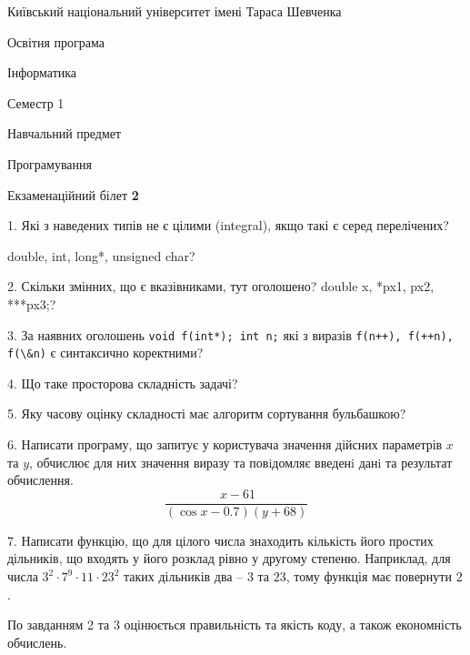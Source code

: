 \documentclass[12pt, ukrainian]{article}
\def\code#1{\Verb!#1!}
\begin{document}
\vspace{0.9cm}
{{\begin {scriptsize}\par
{ \center  Київський національний університет імені Тараса Шевченка \par}
{\parbox {5 cm}{Освітня програма \hfill}{\parbox {7 cm}{Інформатика\hfill}}\parbox {6 cm}{\hfill Семестр 1}}\par
{\parbox {5 cm} {Навчальний предмет \hfill}\parbox {7 cm}{Програмування \hfill}\parbox {6cm}{\hfill}\par}\vspace{-15pt} \end{scriptsize}}{\center Екзаменаційний білет \No \textbf { 2 }\par}}
{%
1. Які з наведених типів не є цілими (integral), якщо такі є серед перелічених?

double, int, long*, unsigned char?
\par
\vspace{2mm}
2. Скільки змінних, що є вказівниками, тут оголошено?
double x, *px1, px2, ***px3;?
\par
\vspace{2mm}
3. За наявних оголошень \code{void f(int*); int n;} які з виразів \code{f(n++), f(++n), f(\&n)} є синтаксично коректними?
\par
\vspace{2mm}
4. Що таке просторова складність задачі?
\par
\vspace{2mm}
5. Яку часову оцінку складності має алгоритм сортування бульбашкою?
\par
\vspace{2mm}
6. Написати програму, що запитує у користувача значення дійсних параметрів $x$ та $y$, обчислює для них значення виразу та повiдомляє введенi данi та результат обчислення.
$$\frac{\ x - 61}{(\cos x - 0.7) (y + 68)}$$ 

\par
7. Написати функцію, що для цілого числа знаходить кількість його простих дільників, що входять у його розклад рівно у другому степеню. Наприклад, для числа $3^2{\cdot}7^9{\cdot}11{\cdot}23^{2}$ таких дільників два – $3$ та $23$, тому функція має повернути $2$.

По завданням 2 та 3 оцінюється правильність та якість коду, а також економність обчислень.

}
\end{document}
